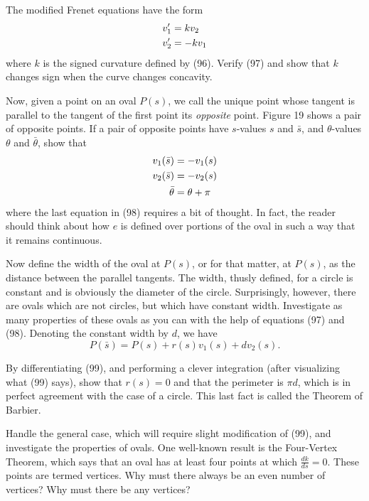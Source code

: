 \documentclass{book}
\begin{document}
The modified Frenet equations have the form
\begin{align}
v'_{1} & = kv_{2} \\
v'_{2} & = - kv_{1} \notag
\end{align}
where $k$ is the signed curvature defined by (96). Verify (97) and show that $k$ changes sign when the curve changes concavity.

Now, given a point on an oval $P(s)$, we call the unique point whose tangent is parallel to the tangent of the first point its \emph{opposite} point. Figure 19 shows a pair of opposite points. If a pair of opposite points have $s$-values $s$ and $\bar{s}$, and $\theta$-values $\theta$ and $\bar{\theta}$, show that
\begin{align}
v_{1}(\bar{s}) & = - v_{1}(s) \notag \\
v_{2}(\bar{s}) & = - v_{2}(s) \\
\bar{\theta} & = \theta + \pi \notag
\end{align}
where the last equation in (98) requires a bit of thought. In fact, the reader should think about how $e$ is defined over portions of the oval in such a way that it remains continuous.

Now define the width of the oval at $P(s)$, or for that matter, at $P(s)$, as the distance between the parallel tangents. The width, thusly defined, for a circle is constant and is obviously the diameter of the circle. Surprisingly, however, there are ovals which are not circles, but which have constant width. Investigate as many properties of these ovals as you can with the help of equations (97) and (98). Denoting the constant width by $d$, we have
\begin{equation}
P(\bar{s}) = P(s) + r(s) v_{1}(s) + dv_{2}(s).
\end{equation}

By differentiating (99), and performing a clever integration (after visualizing what (99) says), show that $r(s) = 0$ and that the perimeter is $\pi d$, which is in perfect agreement with the case of a circle. This last fact is called the Theorem of Barbier.

Handle the general case, which will require slight modification of (99), and investigate the properties of ovals. One well-known result is the Four-Vertex Theorem, which says that an oval has at least four points at which $\frac{dk}{ds} = 0$. These points are termed vertices. Why must there always be an even number of vertices? Why must there be any vertices?
\end{document}
